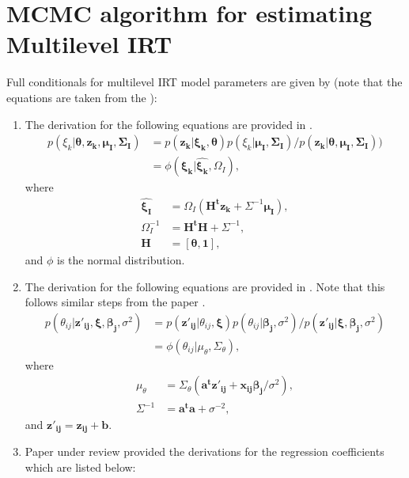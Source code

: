 \documentclass[12pt]{article}
\begin{document}
\section{MCMC algorithm for estimating Multilevel IRT}  \label{sec:full_conditionals_mlirt}
Full conditionals for multilevel IRT model parameters are given by (note that the equations are taken from the \cite{fox2007multilevel}):
\begin{enumerate}
    \item The derivation for the following equations are provided in \cite{lindley1972bayes}.
        \begin{align*}
        p(\xi_k|\boldsymbol{\theta, z_k, \mu_I, \Sigma_I}) & = p(\boldsymbol{z_k|\xi_k, \theta})p(\xi_k|\boldsymbol{\mu_I, \Sigma_I})/p(\boldsymbol{z_k|\theta, \mu_I, \Sigma_I})) \\
        & = \phi(\boldsymbol{\xi_k}|\hat{\boldsymbol{\xi_k}}, \Omega_I),
        \end{align*} where
        \begin{align*}
            \hat{\boldsymbol{\xi_I}} & = \Omega_I(\boldsymbol{H^tz_k} + \Sigma^{-1}\boldsymbol{\mu_I}), \\
            \Omega_I^{-1} & = \boldsymbol{H^tH} + \Sigma^{-1}, \\
            \boldsymbol{H} & = [\boldsymbol{\theta, 1}],
        \end{align*}
        and $\phi$ is the normal distribution.
        
    \item The derivation for the following equations are provided in \cite{albert1992bayesian}. Note that this follows similar steps from the paper \cite{lindley1972bayes}.
    \begin{align*}
        p(\theta_{ij}| \boldsymbol{z'_{ij}, \xi, \beta_j,} \sigma^2) & = p(\boldsymbol{z'_{ij}}|\theta_{ij}, \boldsymbol{\xi}) p(\theta_{ij}|\boldsymbol{\beta_j}, \sigma^2)/p(\boldsymbol{z'_{ij}}|\boldsymbol{\xi, \beta_j,}\sigma^2)\\
        & = \phi(\theta_{ij}|\mu_\theta, \Sigma_\theta),
    \end{align*} where
    \begin{align*}
        \mu_\theta & = \Sigma_\theta(\boldsymbol{a^tz'_{ij} + x_{ij}\beta_j/}\sigma^2),\\
        \Sigma^{-1} & = \boldsymbol{a^ta} + \sigma^{-2},
    \end{align*}
    and $\boldsymbol{z'_{ij}} = \boldsymbol{z_{ij} + b}$.
    
    \item Paper under review \cite{fox2001bayesian} provided the derivations for the regression coefficients which are listed below:
        
\end{enumerate} 
\end{document}
